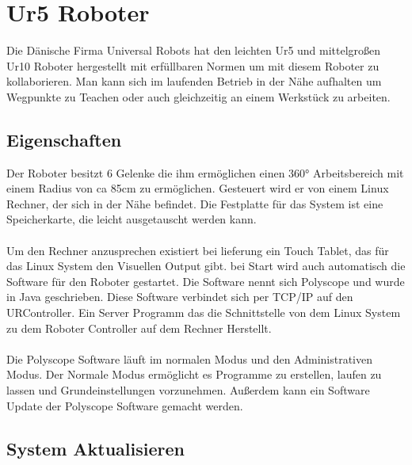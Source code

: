 \section{Ur5 Roboter}
\label{sec:ur_robot_gru}

Die Dänische Firma Universal Robots hat den leichten Ur5 und mittelgroßen Ur10 Roboter hergestellt mit erfüllbaren Normen um mit diesem Roboter zu kollaborieren. Man kann sich im laufenden Betrieb in der Nähe aufhalten um Wegpunkte zu Teachen oder auch gleichzeitig an einem Werkstück zu arbeiten. 

\subsection{Eigenschaften}
\label{ur_eigenschaften_gru}

Der Roboter besitzt 6 Gelenke die ihm ermöglichen einen 360° Arbeitsbereich mit einem Radius von ca 85cm zu ermöglichen. Gesteuert wird er von einem Linux Rechner, der sich in der Nähe befindet. 
Die Festplatte für das System ist eine Speicherkarte, die leicht ausgetauscht werden kann.
\\\\
Um den Rechner anzusprechen existiert bei lieferung ein Touch Tablet, das für das Linux System den Visuellen Output gibt. bei Start wird auch automatisch die Software für den Roboter gestartet. Die Software nennt sich Polyscope und wurde in Java geschrieben. Diese Software verbindet sich per TCP/IP auf den URController. Ein Server Programm das die Schnittstelle von dem Linux System zu dem Roboter Controller auf dem Rechner Herstellt.
\\\\
Die Polyscope Software läuft im normalen Modus und den Administrativen Modus. Der Normale Modus ermöglicht es Programme zu erstellen, laufen zu lassen und Grundeinstellungen vorzunehmen. Außerdem kann ein Software Update der Polyscope Software gemacht werden.

\subsection{System Aktualisieren}
\label{ur_update_gru}

